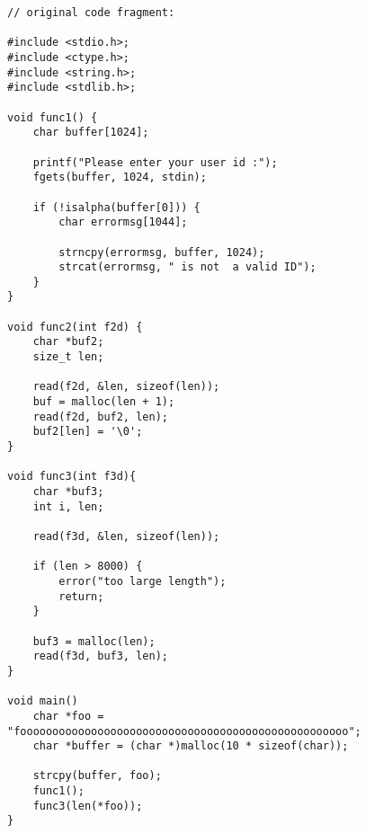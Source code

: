 
\begin{lstlisting}
// original code fragment:

#include <stdio.h>;
#include <ctype.h>;
#include <string.h>;
#include <stdlib.h>;

void func1() {	
    char buffer[1024];
    
    printf("Please enter your user id :");
    fgets(buffer, 1024, stdin);
     
    if (!isalpha(buffer[0])) {
        char errormsg[1044];
             
        strncpy(errormsg, buffer, 1024);
        strcat(errormsg, " is not  a valid ID");
 	}
}

void func2(int f2d) {
    char *buf2;
    size_t len;

    read(f2d, &len, sizeof(len));
    buf = malloc(len + 1);
    read(f2d, buf2, len);
    buf2[len] = '\0';
}

void func3(int f3d){
    char *buf3;
    int i, len;
         
    read(f3d, &len, sizeof(len));
         
    if (len > 8000) { 
        error("too large length"); 
        return; 
    }

    buf3 = malloc(len);
    read(f3d, buf3, len);    
}

void main()
    char *foo = "fooooooooooooooooooooooooooooooooooooooooooooooooooo";
    char *buffer = (char *)malloc(10 * sizeof(char));
    
    strcpy(buffer, foo);
    func1();
    func3(len(*foo));
}
\end{lstlisting}
